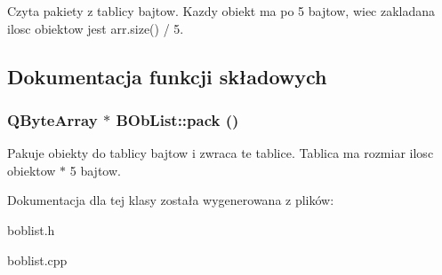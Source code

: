 Czyta pakiety z tablicy bajtow. Kazdy obiekt ma po 5 bajtow, wiec zakladana ilosc obiektow jest arr.size() / 5. 

\subsection{Dokumentacja funkcji składowych}
\hypertarget{class_b_ob_list_adfa68bde6e6c3c6641735fb552a76d80}{
\subsubsection[{pack}]{\setlength{\rightskip}{0pt plus 5cm}QByteArray $\ast$ BObList::pack ()}}
\label{class_b_ob_list_adfa68bde6e6c3c6641735fb552a76d80}


Pakuje obiekty do tablicy bajtow i zwraca te tablice. Tablica ma rozmiar ilosc obiektow $\ast$ 5 bajtow. 

Dokumentacja dla tej klasy została wygenerowana z plików:\begin{DoxyCompactItemize}
\item 
boblist.h\item 
boblist.cpp\end{DoxyCompactItemize}
